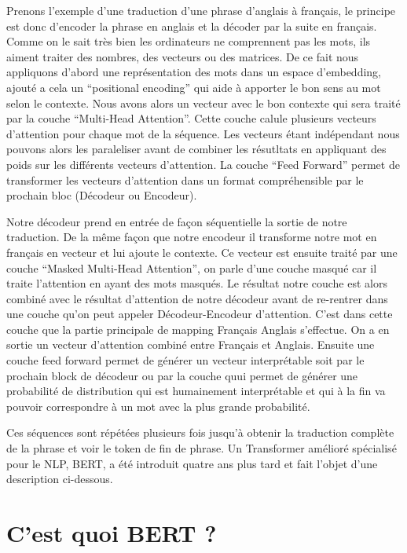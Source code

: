 \documentclass[8pt]{article}
\begin{document}
Prenons l'exemple d'une traduction d'une phrase d'anglais à français, le
principe est donc d'encoder la phrase en anglais et la décoder par la
suite en français. Comme on le sait très bien les ordinateurs ne
comprennent pas les mots, ils aiment traiter des nombres, des vecteurs
ou des matrices. De ce fait nous appliquons d'abord une représentation
des mots dans un espace d'embedding, ajouté a cela un ``positional
encoding'' qui aide à apporter le bon sens au mot selon le contexte.
Nous avons alors un vecteur avec le bon contexte qui sera traité par la
couche ``Multi-Head Attention''. Cette couche calule plusieurs vecteurs
d'attention pour chaque mot de la séquence. Les vecteurs étant
indépendant nous pouvons alors les paraleliser avant de combiner les
résutltats en appliquant des poids sur les différents vecteurs
d'attention. La couche ``Feed Forward'' permet de transformer les
vecteurs d'attention dans un format compréhensible par le prochain bloc
(Décodeur ou Encodeur).

Notre décodeur prend en entrée de façon séquentielle la sortie de notre
traduction. De la même façon que notre encodeur il transforme notre mot
en français en vecteur et lui ajoute le contexte. Ce vecteur est ensuite
traité par une couche ``Masked Multi-Head Attention'', on parle d'une
couche masqué car il traite l'attention en ayant des mots masqués. Le
résultat notre couche est alors combiné avec le résultat d'attention de
notre décodeur avant de re-rentrer dans une couche qu'on peut appeler
Décodeur-Encodeur d'attention. C'est dans cette couche que la partie
principale de mapping Français Anglais s'effectue. On a en sortie un
vecteur d'attention combiné entre Français et Anglais. Ensuite une
couche feed forward permet de générer un vecteur interprétable soit par
le prochain block de décodeur ou par la couche quui permet de générer
une probabilité de distribution qui est humainement interprétable et qui
à la fin va pouvoir correspondre à un mot avec la plus grande
probabilité.

Ces séquences sont répétées plusieurs fois jusqu'à obtenir la traduction
complète de la phrase et voir le token de fin de phrase. Un Transformer
amélioré spécialisé pour le NLP, BERT, a été introduit quatre ans plus
tard et fait l'objet d'une description ci-dessous.

    \hypertarget{cest-quoi-bert}{%
\section{C'est quoi BERT ?}\label{cest-quoi-bert}}
\end{document}
